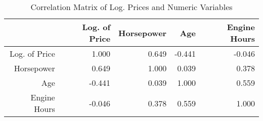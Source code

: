\begin{table}[ht]
\centering
\begin{tabular}{rrrrr}
  \hline
 & Log. of Price & Horsepower & Age & Engine Hours \\ 
  \hline
Log. of Price & 1.000 & 0.649 & -0.441 & -0.046 \\ 
  Horsepower & 0.649 & 1.000 & 0.039 & 0.378 \\ 
  Age & -0.441 & 0.039 & 1.000 & 0.559 \\ 
  Engine Hours & -0.046 & 0.378 & 0.559 & 1.000 \\ 
   \hline
\end{tabular}
\caption{Correlation Matrix of Log. Prices and Numeric Variables} 
\label{tab:correlation_num}
\end{table}
